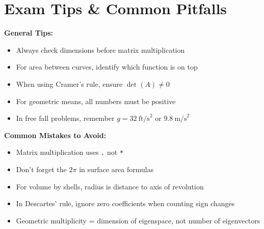 \documentclass[12pt,a4paper]{article}
\begin{document}
\section{Exam Tips \& Common Pitfalls}

\begin{tipbox}
    \textbf{General Tips:}
    \begin{itemize}
        \item Always check dimensions before matrix multiplication
        \item For area between curves, identify which function is on top
        \item When using Cramer's rule, ensure \(\det(A) \neq 0\)
        \item For geometric means, all numbers must be positive
        \item In free fall problems, remember \(g = 32\ \text{ft/s}^2\) or \(9.8\ \text{m/s}^2\)
    \end{itemize}
\end{tipbox}

\begin{tipbox}
    \textbf{Common Mistakes to Avoid:}
    \begin{itemize}
        \item Matrix multiplication uses \texttt{.} not \texttt{*}
        \item Don't forget the \(2\pi\) in surface area formulas
        \item For volume by shells, radius is distance to axis of revolution
        \item In Descartes' rule, ignore zero coefficients when counting sign changes
        \item Geometric multiplicity = dimension of eigenspace, not number of eigenvectors
    \end{itemize}
\end{tipbox}

\end{document}
